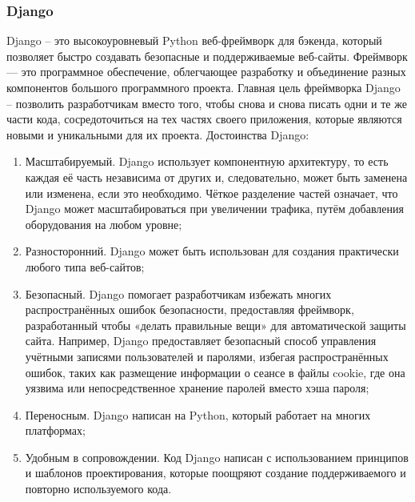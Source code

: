 \def\notedate{2022.10.24}
\def\currentauthor{Василян А.Р. (РК6-73Б)}

\subsubsection{Django}
	Django – это высокоуровневый Python веб-фреймворк для бэкенда, который позволяет быстро создавать безопасные и поддерживаемые веб-сайты. Фреймворк — это программное обеспечение, облегчающее разработку и объединение разных компонентов большого программного проекта.
	Главная цель фреймворка Django – позволить разработчикам вместо того, чтобы снова и снова писать одни и те же части кода, сосредоточиться на тех частях своего приложения, которые являются новыми и уникальными для их проекта.
	Достоинства Django:
\begin{enumerate}
	\item Масштабируемый.  Django использует компонентную архитектуру, то есть каждая её часть независима от других и, следовательно, может быть заменена или изменена, если это необходимо. Чёткое разделение частей означает, что Django может масштабироваться при увеличении трафика, путём добавления оборудования на любом уровне;
	\item Разносторонний. Django может быть использован для создания практически любого типа веб-сайтов;
	\item Безопасный. Django помогает разработчикам избежать многих распространённых ошибок безопасности, предоставляя фреймворк, разработанный чтобы «делать правильные вещи» для автоматической защиты сайта. Например, Django предоставляет безопасный способ управления учётными записями пользователей и паролями, избегая распространённых ошибок, таких как размещение информации о сеансе в файлы cookie, где она уязвима или непосредственное хранение паролей вместо хэша пароля;
	\item Переносным. Django написан на Python, который работает на многих платформах;
	\item Удобным в сопровождении. Код Django написан с использованием принципов и шаблонов проектирования, которые поощряют создание поддерживаемого и повторно используемого кода.
\end{enumerate}

